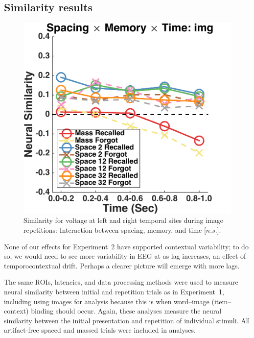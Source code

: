 \subsection{Similarity results}

\begin{figure}[H]
  \centering
  \includegraphics[width=.40\textwidth]{./figs/exp2/similarity_spacXmemXtime_img_tla_LTRT_0to200_200to400_400to600_600to800_800to1000_kaiser_cosine}
  \caption{Similarity for voltage at left and right temporal sites during image repetitions: Interaction between spacing, memory, and time [$n.s.$].}
  \label{fig:s2_sim_tla_spacXmemXtime}
\end{figure}


None of our effects for Experiment~2 have supported contextual variability; to do so, we would need to see more variability in EEG at as lag increases, an effect of temporocontextual drift.
Perhaps a clearer picture will emerge with more lags.


The same ROIs, latencies, and data processing methods were used to measure neural similarity between initial and repetition trials as in Experiment~1, including using images for analysis because this is when word--image (item--context) binding should occur.  Again, these analyses measure the neural similarity between the initial presentation and repetition of individual stimuli.  All artifact-free spaced and massed trials were included in analyses.
 

